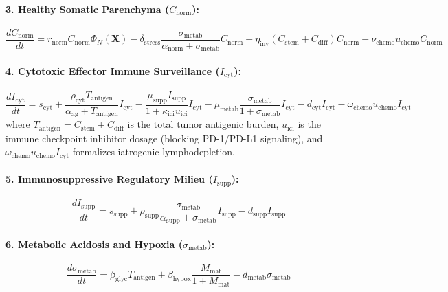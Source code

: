 \documentclass[11pt,a4paper]{article}
\begin{document}
\paragraph{3. Healthy Somatic Parenchyma ($C_{\mathrm{norm}}$):}
\begin{equation}
\frac{d C_{\mathrm{norm}}}{dt} = r_{\mathrm{norm}} C_{\mathrm{norm}} \Phi_N(\bm{X}) - \delta_{\mathrm{stress}} \frac{\sigma_{\mathrm{metab}}}{\alpha_{\mathrm{norm}} + \sigma_{\mathrm{metab}}} C_{\mathrm{norm}} - \eta_{\mathrm{inv}} (C_{\mathrm{stem}} + C_{\mathrm{diff}}) C_{\mathrm{norm}} - \nu_{\mathrm{chemo}} u_{\mathrm{chemo}} C_{\mathrm{norm}}
\end{equation}

\paragraph{4. Cytotoxic Effector Immune Surveillance ($I_{\mathrm{cyt}}$):}
\begin{equation}
\frac{d I_{\mathrm{cyt}}}{dt} = s_{\mathrm{cyt}} + \frac{\rho_{\mathrm{cyt}} T_{\mathrm{antigen}}}{\alpha_{\mathrm{ag}} + T_{\mathrm{antigen}}} I_{\mathrm{cyt}} - \frac{\mu_{\mathrm{supp}} I_{\mathrm{supp}}}{1 + \kappa_{\mathrm{ici}} u_{\mathrm{ici}}} I_{\mathrm{cyt}} - \mu_{\mathrm{metab}} \frac{\sigma_{\mathrm{metab}}}{1 + \sigma_{\mathrm{metab}}} I_{\mathrm{cyt}} - d_{\mathrm{cyt}} I_{\mathrm{cyt}} - \omega_{\mathrm{chemo}} u_{\mathrm{chemo}} I_{\mathrm{cyt}}
\end{equation}
where $T_{\mathrm{antigen}} = C_{\mathrm{stem}} + C_{\mathrm{diff}}$ is the total tumor antigenic burden, $u_{\mathrm{ici}}$ is the immune checkpoint inhibitor dosage (blocking PD-1/PD-L1 signaling), and $\omega_{\mathrm{chemo}} u_{\mathrm{chemo}} I_{\mathrm{cyt}}$ formalizes iatrogenic lymphodepletion.

\paragraph{5. Immunosuppressive Regulatory Milieu ($I_{\mathrm{supp}}$):}
\begin{equation}
\frac{d I_{\mathrm{supp}}}{dt} = s_{\mathrm{supp}} + \rho_{\mathrm{supp}} \frac{\sigma_{\mathrm{metab}}}{\alpha_{\mathrm{supp}} + \sigma_{\mathrm{metab}}} I_{\mathrm{supp}} - d_{\mathrm{supp}} I_{\mathrm{supp}}
\end{equation}

\paragraph{6. Metabolic Acidosis and Hypoxia ($\sigma_{\mathrm{metab}}$):}
\begin{equation}
\frac{d \sigma_{\mathrm{metab}}}{dt} = \beta_{\mathrm{glyc}} T_{\mathrm{antigen}} + \beta_{\mathrm{hypox}} \frac{M_{\mathrm{mat}}}{1 + M_{\mathrm{mat}}} - d_{\mathrm{metab}} \sigma_{\mathrm{metab}}
\end{equation}
\end{document}
